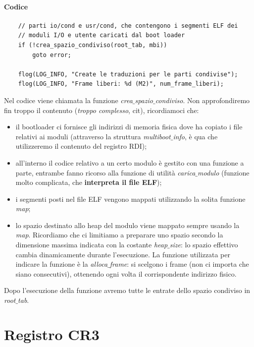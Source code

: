 \documentclass[11pt]{report}
\theoremstyle{definition}
\begin{document}
\paragraph{Codice}
	\small 
	\begin{verbatim}
	// parti io/cond e usr/cond, che contengono i segmenti ELF dei
	// moduli I/O e utente caricati dal boot loader
	if (!crea_spazio_condiviso(root_tab, mbi))
	    goto error;
	
	flog(LOG_INFO, "Create le traduzioni per le parti condivise");
	flog(LOG_INFO, "Frame liberi: %d (M2)", num_frame_liberi);
	\end{verbatim}
	\normalsize 
	Nel codice viene chiamata la funzione \emph{crea$\_$spazio$\_$condiviso}. Non approfondiremo fin troppo il contenuto (\textit{troppo complesso}, cit), ricordiamoci che:
	\begin{itemize}
		\item il bootloader ci fornisce gli indirizzi di memoria fisica dove ha copiato i file relativi ai moduli (attraverso la struttura \emph{multiboot$\_$info}, è qua che utilizzeremo il contenuto del registro RDI);
		\item all'interno il codice relativo a un certo modulo è gestito con una funzione a parte, entrambe fanno ricorso alla funzione di utilità \emph{carica$\_$modulo} (funzione molto complicata, che \textbf{interpreta il file ELF});
		\item i segmenti posti nel file ELF vengono mappati utilizzando la solita funzione \emph{map};
		\item lo spazio destinato allo heap del modulo viene mappato sempre usando la \emph{map}. Ricordiamo che ci limitiamo a preparare uno spazio secondo la dimensione massima indicata con la costante \emph{heap$\_$size}: lo spazio effettivo cambia dinamicamente durante l'esecuzione. La funzione utilizzata per indicare la funzione è la \emph{alloca$\_$frame}: si scelgono i frame (non ci importa che siano consecutivi), ottenendo ogni volta il corrispondente indirizzo fisico. 
	\end{itemize}
	Dopo l'esecuzione della funzione avremo tutte le entrate dello spazio condiviso in \emph{root$\_$tab}. 
	
\section{Registro CR3}
	
\end{document}
